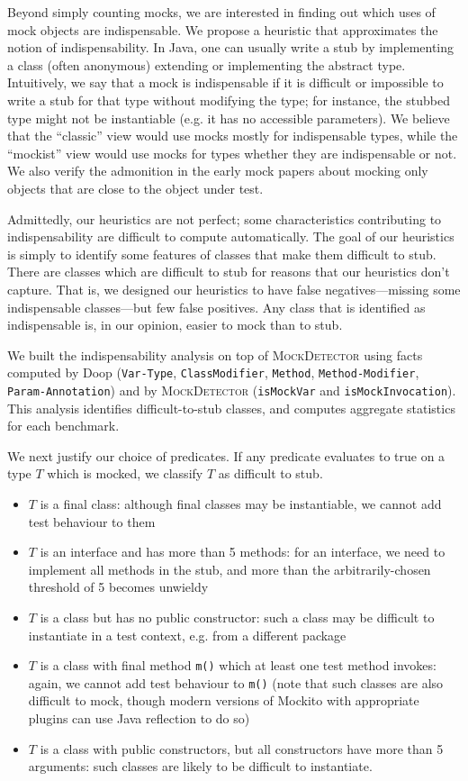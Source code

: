 Beyond simply counting mocks, we are interested in finding out which
uses of mock objects are indispensable.  We propose a heuristic that
approximates the notion of indispensability. In Java, one can usually
write a stub by implementing a class (often anonymous) extending or
implementing the abstract type. Intuitively, we say that a mock is
indispensable if it is difficult or impossible to write a stub for
that type without modifying the type; for instance, the stubbed type might
not be instantiable (e.g. it has no accessible parameters). We believe that
the ``classic'' view would use mocks mostly for indispensable types, while
the ``mockist'' view would use mocks for types whether they are indispensable or not.
We also verify the admonition in the early mock papers about mocking only objects
that are close to the object under test.

Admittedly, our heuristics are not perfect; some characteristics contributing
to indispensability are difficult to compute automatically. The goal of our heuristics
is simply to identify some features of classes that make them difficult to stub.
There are classes which are difficult to stub for reasons that our heuristics don't capture.
That is, we designed our heuristics to have false negatives---missing some indispensable
classes---but few false positives. Any class that is identified as indispensable is,
in our opinion, easier to mock than to stub.

We built the indispensability analysis on top of \textsc{MockDetector}
using facts computed by Doop
(\texttt{Var-Type}, \texttt{ClassModifier}, \texttt{Method}, \texttt{Method-Modifier}, \texttt{Param-Annotation})
and by \textsc{MockDetector} (\texttt{isMockVar}
and \texttt{isMockInvocation}). This analysis identifies difficult-to-stub classes, and
computes aggregate statistics for each benchmark.

We next justify our choice of predicates. If any predicate evaluates to true on a type $T$ which is mocked, we 
classify $T$ as difficult to stub.

\begin{itemize}
\item $T$ is a final class: although final classes may be instantiable, we cannot add test behaviour to them
\item $T$ is an interface and has more than 5 methods: for an interface, we need to implement all methods in the stub, and more than the arbitrarily-chosen threshold of 5 becomes unwieldy
\item $T$ is a class but has no public constructor: such a class may be difficult to instantiate in a test context, e.g. from a different package
\item $T$ is a class with final method \texttt{m()} which at least one test method invokes: again, we cannot add test behaviour to \texttt{m()} (note that such classes are also difficult to mock, though modern versions of Mockito with appropriate plugins can use Java reflection to do so)
\item $T$ is a class with public constructors, but all constructors have more than 5 arguments: such classes are likely to be difficult to instantiate.
\end{itemize}


